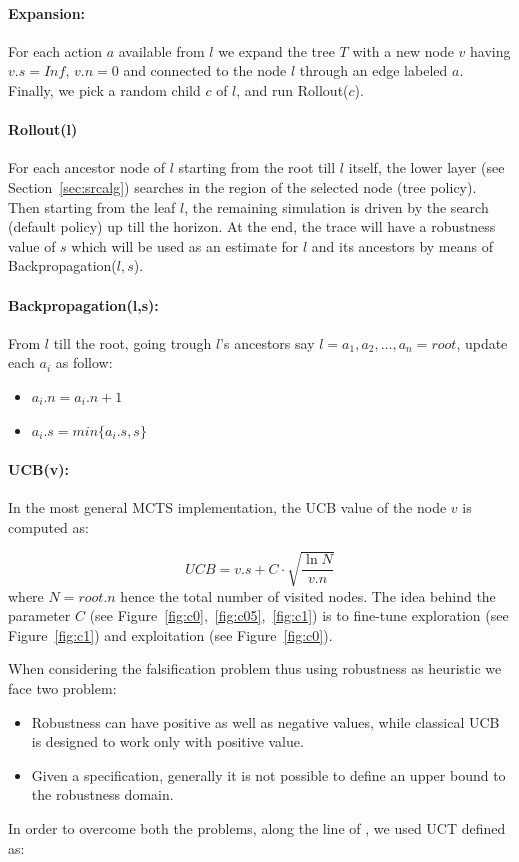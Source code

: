 \documentclass[11pt]{article}
\begin{document}
\paragraph{Expansion:} For each action $a$ available from $l$ we expand the tree $T$ with a new node $v$ having $v.s=Inf$, $v.n=0$ and connected to the node $l$ through an edge labeled $a$. Finally, we pick a random child $c$ of $l$, and run Rollout($c$).

\paragraph{Rollout(l)} For each ancestor node of $l$ starting from the root till $l$ itself, the lower layer (see Section~\ref{sec:srcalg}) searches in the region of the selected node (tree policy). Then starting from the leaf $l$, the remaining simulation is driven by the search (default policy) up till the horizon. At the end, the trace will have a robustness value of $s$ which will be used as an estimate for $l$ and its ancestors by means of Backpropagation($l,s$).

\paragraph{Backpropagation(l,s):} From $l$ till the root, going trough $l$'s ancestors say $l=a_1, a_2, \dots, a_n=root$, update each $a_i$ as follow:
\begin{itemize}
    \item $a_i.n=a_i.n + 1$
    \item $a_i.s=min\{a_i.s, s\}$
\end{itemize}

\paragraph{UCB(v):} In the most general MCTS implementation, the UCB value of the node $v$ is computed as:

\begin{equation}
    UCB = v.s + C \cdot \sqrt{\frac{\ln N}{v.n}}
\end{equation}
where $N = root.n$ hence the total number of visited nodes. The idea behind the parameter $C$ (see Figure~\ref{fig:c0},~\ref{fig:c05},~\ref{fig:c1}) is to fine-tune exploration (see Figure~\ref{fig:c1}) and exploitation (see Figure~\ref{fig:c0}). 

When considering the falsification problem thus using robustness as heuristic we face two problem:
\begin{itemize}
    \item Robustness can have positive as well as negative values, while classical UCB is designed to work only with positive value. 
    \item Given a specification, generally it is not possible to define an upper bound to the robustness domain. 
\end{itemize}
In order to overcome both the problems, along the line of \cite{zhang2018two}, we used UCT defined as:
\end{document}
